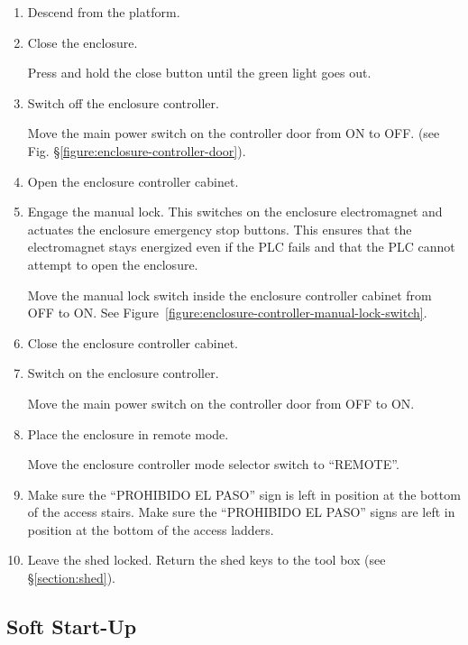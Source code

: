 \begin{enumerate}
\fi

\item
Descend from the platform.

\item 
Close the enclosure.

Press and hold the close button until the green light goes out.

\item
Switch off the enclosure controller.

Move the main power switch on the controller door from ON to OFF. (see Fig. \S\ref{figure:enclosure-controller-door}).
\item
Open the enclosure controller cabinet.

\item
Engage the manual lock. This switches on the enclosure electromagnet and actuates the enclosure emergency stop buttons. This ensures that the electromagnet stays energized even if the PLC fails and that the PLC cannot attempt to open the enclosure.

Move the manual lock switch inside the enclosure controller cabinet from OFF to ON. See Figure~\ref{figure:enclosure-controller-manual-lock-switch}.

\item
Close the enclosure controller cabinet.

\item
Switch on the enclosure controller.

Move the main power switch on the controller door from OFF to ON.

\item
Place the enclosure in remote mode.

Move the enclosure controller mode selector switch to “REMOTE”.

\item
\ifcoatlioan
Make sure the “PROHIBIDO EL PASO” sign is left in position at the bottom of the access stairs.
\fi
\ifddotioan
Make sure the “PROHIBIDO EL PASO” signs are left in position at the bottom of the access ladders.
\fi

\item
Leave the shed locked. Return the shed keys to the tool box (see \S\ref{section:shed}).

\end{enumerate}

\subsection{Soft Start-Up}
\label{section:soft-start-up}


